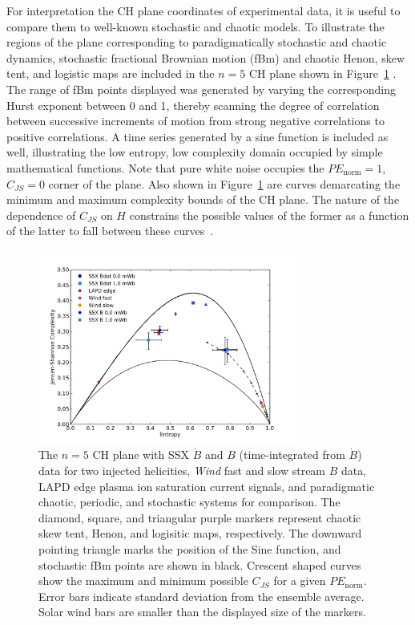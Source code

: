 \documentclass[aps,pre,twocolumn,secnumarabic,nobalancelastpage,amsmath,amssymb,
nofootinbib]{revtex4-1}
\begin{document}
For interpretation the CH plane coordinates of experimental data, it is useful to compare them to well-known stochastic and chaotic models. To illustrate the regions of the plane corresponding to paradigmatically stochastic and chaotic dynamics, stochastic fractional Brownian motion (fBm) and chaotic Henon, skew tent, and logistic maps are included in the $n=5$ CH plane shown in Figure~\ref{fig:CHplane} \cite{rosso2007}. The range of fBm points displayed was generated by varying the corresponding Hurst exponent between 0 and 1, thereby scanning the degree of correlation between successive increments of motion from strong negative correlations to positive correlations. A time series generated by a sine function is included as well, illustrating the low entropy, low complexity domain occupied by simple mathematical functions. Note that pure white noise occupies the $PE_{\text{norm}}=1$, $C_{JS}=0$ corner of the plane. Also shown in Figure~\ref{fig:CHplane} are curves demarcating the minimum and maximum complexity bounds of the CH plane. The nature of the dependence of $C_{JS}$ on $H$ constrains the possible values of the former as a function of the latter to fall between these curves~\cite{lopez1995,calbet2001}.
%
\begin{figure}[!htbp]
\centerline{
\includegraphics[width=8.5cm]{fig1new.png}}
\caption{\label{fig:CHplane} The $n=5$ CH plane  with SSX $\dot{B}$ and $B$ (time-integrated from $\dot{B}$) data for two injected helicities, \textit{Wind} fast and slow stream $B$ data, LAPD edge plasma ion saturation current signals, and paradigmatic chaotic, periodic, and stochastic systems for comparison. The diamond, square, and triangular purple markers represent chaotic skew tent, Henon, and logisitic maps, respectively. The downward pointing triangle marks the position of the Sine function, and stochastic fBm points are shown in black. Crescent shaped curves show the maximum and minimum possible $C_{JS}$ for a given $PE_{\text{norm}}$. Error bars indicate standard deviation from the ensemble average. Solar wind bars are smaller than the displayed size of the markers.}
\end{figure}
\end{document}
